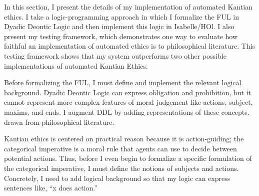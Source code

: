 %
\begin{isabellebody}%
%
%
\isadelimtheory
%
\endisadelimtheory
%
\isatagtheory
%
\endisatagtheory
{\isafoldtheory}%
%
\isadelimtheory
%
\endisadelimtheory
%
\isadelimdocument
%
\endisadelimdocument
%
\isatagdocument
%
\isamarkuptrue%
%
\endisatagdocument
{\isafolddocument}%
%
\isadelimdocument
%
\endisadelimdocument
%
\begin{isamarkuptext}%
In this section, I present the details of my implementation of automated Kantian ethics. I take
a logic-programming approach in which I formalize the FUL in Dyadic Deontic Logic and then implement 
this logic in Isabelle/HOl. I 
also present my testing framework, which demonstrates one way to evaluate how faithful an implementation
of automated ethics is to philosophical literature. This testing framework shows that my system outperforms
two other possible implementations of automated Kantian Ethics.%
\end{isamarkuptext}\isamarkuptrue%
%
\isadelimdocument
%
\endisadelimdocument
%
\isatagdocument
%
\isamarkuptrue%
%
\endisatagdocument
{\isafolddocument}%
%
\isadelimdocument
%
\endisadelimdocument
%
\begin{isamarkuptext}%
Before formalizing the FUL, I must define and implement the relevant logical background. Dyadic
Deontic Logic can express obligation and prohibition, but it cannot represent more complex features of 
moral judgement like actions, subject, maxims, and ends. I augment DDL by adding representations 
of these concepts, drawn from philosophical literature.%
\end{isamarkuptext}\isamarkuptrue%
%
\isadelimdocument
%
\endisadelimdocument
%
\isatagdocument
%
\isamarkuptrue%
%
\endisatagdocument
{\isafolddocument}%
%
\isadelimdocument
%
\endisadelimdocument
%
\begin{isamarkuptext}%
Kantian ethics is centered on practical reason because it is action-guiding; the categorical
imperative is a moral rule that agents can use to decide between potential actions. Thus, before I even
begin to formalize a specific formulation of the categorical imperative, I must define the notions of 
subjects and actions. Concretely, I need to add logical background so that my logic can express sentences 
like, ``x does action.''%
\end{isamarkuptext}\isamarkuptrue%

\end{isabellebody}
